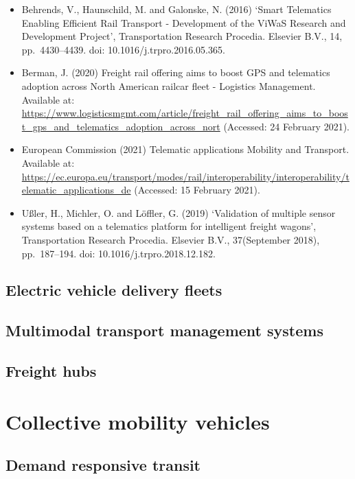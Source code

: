 \documentclass[
]{book}
\providecommand{\tightlist}{%
  \setlength{\itemsep}{0pt}\setlength{\parskip}{0pt}}
\begin{document}
\begin{itemize}
\tightlist
\item
  Behrends, V., Haunschild, M. and Galonske, N. (2016) `Smart Telematics Enabling Efficient Rail Transport - Development of the ViWaS Research and Development Project', Transportation Research Procedia. Elsevier B.V., 14, pp.~4430--4439. doi: 10.1016/j.trpro.2016.05.365.
\item
  Berman, J. (2020) Freight rail offering aims to boost GPS and telematics adoption across North American railcar fleet - Logistics Management. Available at: \url{https://www.logisticsmgmt.com/article/freight_rail_offering_aims_to_boost_gps_and_telematics_adoption_across_nort} (Accessed: 24 February 2021).
\item
  European Commission (2021) Telematic applications \textbar{} Mobility and Transport. Available at: \url{https://ec.europa.eu/transport/modes/rail/interoperability/interoperability/telematic_applications_de} (Accessed: 15 February 2021).
\item
  Ußler, H., Michler, O. and Löffler, G. (2019) `Validation of multiple sensor systems based on a telematics platform for intelligent freight wagons', Transportation Research Procedia. Elsevier B.V., 37(September 2018), pp.~187--194. doi: 10.1016/j.trpro.2018.12.182.
\end{itemize}

\hypertarget{electric_delivery_fleets}{%
\section{Electric vehicle delivery fleets}\label{electric_delivery_fleets}}

\hypertarget{mtms}{%
\section{Multimodal transport management systems}\label{mtms}}

\hypertarget{freight_hubs}{%
\section{Freight hubs}\label{freight_hubs}}

\hypertarget{collective}{%
\chapter{Collective mobility vehicles}\label{collective}}

\hypertarget{drt}{%
\section{Demand responsive transit}\label{drt}}
\end{document}
